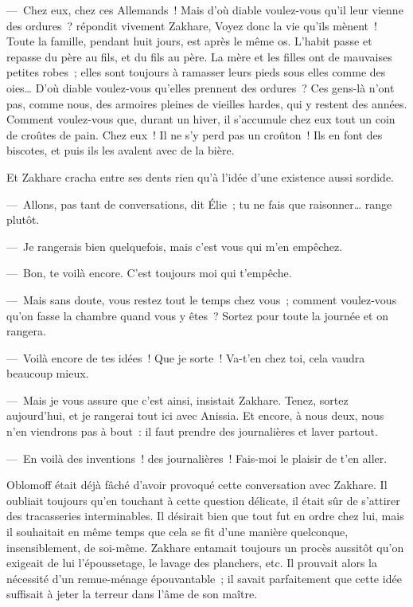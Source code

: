 \documentclass[french,twoside]{book} %
\begin{document}
— Chez eux, chez ces Allemands ! Mais d’où diable voulez-vous qu’il leur vienne des ordures ? répondit vivement Zakhare, Voyez donc la vie qu’ils mènent ! Toute la famille, pendant huit jours, est après le même os. L’habit passe et repasse du père au fils, et du fils au père. La mère et les filles ont de mauvaises petites robes ; elles sont toujours à ramasser leurs pieds sous elles comme des oies… D’où diable voulez-vous qu’elles prennent des ordures ? Ces gens-là n’ont pas, comme nous, des armoires pleines de vieilles hardes, qui y restent des années. Comment voulez-vous que, durant un hiver, il s’accumule chez eux tout un coin de croûtes de pain. Chez eux ! Il ne s’y perd pas un croûton ! Ils en font des biscotes, et puis ils les avalent avec de la bière.\par
Et Zakhare cracha entre ses dents rien qu’à l’idée d’une existence aussi sordide.\par
— Allons, pas tant de conversations, dit Élie ; tu ne fais que raisonner… range plutôt.\par
— Je rangerais bien quelquefois, mais c’est vous qui m’en empêchez.\par
— Bon, te voilà encore. C’est toujours moi qui t’empêche.\par
— Mais sans doute, vous restez tout le temps chez vous ; comment voulez-vous qu’on fasse la chambre quand vous y êtes ? Sortez pour toute la journée et on rangera.\par
— Voilà encore de tes idées ! Que je sorte ! Va-t’en chez toi, cela vaudra beaucoup mieux.\par
— Mais je vous assure que c’est ainsi, insistait Zakhare. Tenez, sortez aujourd’hui, et je rangerai tout ici avec Anissia. Et encore, à nous deux, nous n’en viendrons pas à bout : il faut prendre des journalières et laver partout.\par
— En voilà des inventions ! des journalières ! Fais-moi le plaisir de t’en aller.\par
Oblomoff était déjà fâché d’avoir provoqué cette conversation avec Zakhare. Il oubliait toujours qu’en touchant à cette question délicate, il était sûr de s’attirer des tracasseries interminables. Il désirait bien que tout fut en ordre chez lui, mais il souhaitait en même temps que cela se fit d’une manière quelconque, insensiblement, de soi-même. Zakhare entamait toujours un procès aussitôt qu’on exigeait de lui l’époussetage, le lavage des planchers, etc. Il prouvait alors la nécessité d’un remue-ménage épouvantable ; il savait parfaitement que cette idée suffisait à jeter la terreur dans l’âme de son maître.\par
\end{document}
